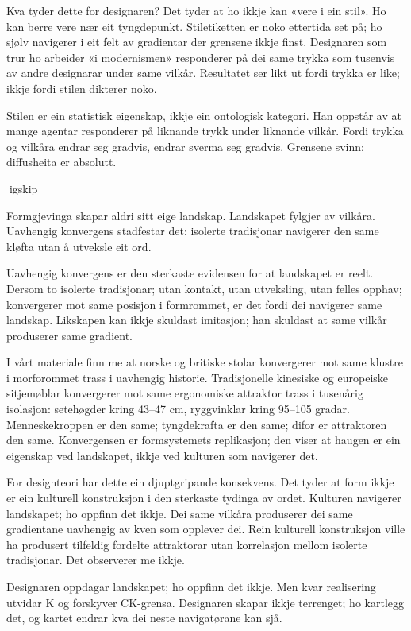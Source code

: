 Kva tyder dette for designaren? Det tyder at ho ikkje kan «vere i ein stil». Ho kan berre vere nær eit tyngdepunkt. Stiletiketten er noko ettertida set på; ho sjølv navigerer i eit felt av gradientar der grensene ikkje finst. Designaren som trur ho arbeider «i modernismen» responderer på dei same trykka som tusenvis av andre designarar under same vilkår. Resultatet ser likt ut fordi trykka er like; ikkje fordi stilen dikterer noko.

Stilen er ein statistisk eigenskap, ikkje ein ontologisk kategori. Han oppstår av at mange agentar responderer på liknande trykk under liknande vilkår. Fordi trykka og vilkåra endrar seg gradvis, endrar sverma seg gradvis. Grensene svinn; diffusheita er absolutt.

igskip

Formgjevinga skapar aldri sitt eige landskap. Landskapet fylgjer av vilkåra. Uavhengig konvergens stadfestar det: isolerte tradisjonar navigerer den same kløfta utan å utveksle eit ord.

Uavhengig konvergens er den sterkaste evidensen for at landskapet er reelt. Dersom to isolerte tradisjonar; utan kontakt, utan utveksling, utan felles opphav; konvergerer mot same posisjon i formrommet, er det fordi dei navigerer same landskap. Likskapen kan ikkje skuldast imitasjon; han skuldast at same vilkår produserer same gradient.

I vårt materiale finn me at norske og britiske stolar konvergerer mot same klustre i morforommet trass i uavhengig historie. Tradisjonelle kinesiske og europeiske sitjemøblar konvergerer mot same ergonomiske attraktor trass i tusenårig isolasjon: setehøgder kring 43--47 cm, ryggvinklar kring 95--105 gradar. Menneskekroppen er den same; tyngdekrafta er den same; difor er attraktoren den same. Konvergensen er formsystemets replikasjon; den viser at haugen er ein eigenskap ved landskapet, ikkje ved kulturen som navigerer det.

For designteori har dette ein djuptgripande konsekvens. Det tyder at form ikkje er ein kulturell konstruksjon i den sterkaste tydinga av ordet. Kulturen navigerer landskapet; ho oppfinn det ikkje. Dei same vilkåra produserer dei same gradientane uavhengig av kven som opplever dei. Rein kulturell konstruksjon ville ha produsert tilfeldig fordelte attraktorar utan korrelasjon mellom isolerte tradisjonar. Det observerer me ikkje.

Designaren oppdagar landskapet; ho oppfinn det ikkje. Men kvar realisering utvidar K og forskyver CK-grensa. Designaren skapar ikkje terrenget; ho kartlegg det, og kartet endrar kva dei neste navigatørane kan sjå.

